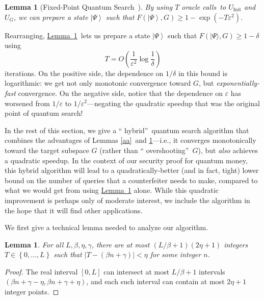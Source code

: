 \documentclass[10pt]{article}
\newtheorem{lemma}[theorem]{Lemma}
\theoremstyle{definition}
\numberwithin{equation}{section}
\newcommand{\expref}[2]{\texorpdfstring{\hyperref[#2]{#1~\ref{#2}}}{#1~\ref{#2}}}
\begin{document}
\begin{lemma}
[Fixed-Point Quantum Search~\cite{tgp,crr}]\label{fixedpoint}By using $T$
oracle calls\ to $U_{\operatorname*{Init}}$ and $U_{G}$, we can prepare a
state $\left\vert \Psi\right\rangle $ such that $F\left(  \left\vert
\Psi\right\rangle ,G\right)  \geq1-\exp(  -T\varepsilon^{2})$.
\end{lemma}

Rearranging, \expref{Lemma}{fixedpoint}\ lets us prepare a state $\left\vert
\Psi\right\rangle $ such that $F(\vert \Psi\rangle
,G)  \geq1-\delta$ using 
\[
T=O\left(\frac{1}{\varepsilon^{2}}\log
\frac{1}{\delta}\right)
\]
iterations. On the positive side, the dependence
on $1/\delta$ in this bound is logarithmic: we get not only monotonic
convergence toward $G$, but \emph{exponentially-fast} convergence. On the
negative side, notice that the dependence on $\varepsilon$ has worsened from
$1/\varepsilon$ to $1/\varepsilon^{2}$---negating the quadratic speedup that
was the original point of quantum search!

In the rest of this section, we give a \textquotedblleft
hybrid\textquotedblright\ quantum search algorithm that combines the
advantages of Lemmas \ref{aa}\ and \ref{fixedpoint}---i.e., it converges
monotonically toward the target subspace $G$ (rather than \textquotedblleft
overshooting\textquotedblright\ $G$), but \emph{also} achieves a quadratic
speedup. In the context of our security proof for quantum money, this hybrid
algorithm will lead to a quadratically-better (and in fact, tight) lower bound
on the number of queries that a counterfeiter needs to make, compared to what
we would get from using \expref{Lemma}{fixedpoint} alone. While this quadratic
improvement is perhaps only of moderate interest, we include the algorithm in
the hope that it will find other applications.

We first give a technical lemma needed to analyze our algorithm.

\begin{lemma}
\label{interval}For all $L,\beta,\eta,\gamma$, there are at most $\left(
L/\beta+1\right)  \left(  2\eta+1\right)  $ integers $T\in\left\{
0,\ldots,L\right\}$ such that $\left\vert T-\left(  \beta n+\gamma\right)
\right\vert <\eta$ for some integer $n$.
\end{lemma}

\begin{proof}
The real interval $\left[  0,L\right]  $ can intersect at most $L/\beta
+1$ intervals $\left(  \beta n+\gamma-\eta,\beta n+\gamma+\eta\right)  $, and
each such interval can contain at most $2\eta+1$ integer points.
\end{proof}
\end{document}

